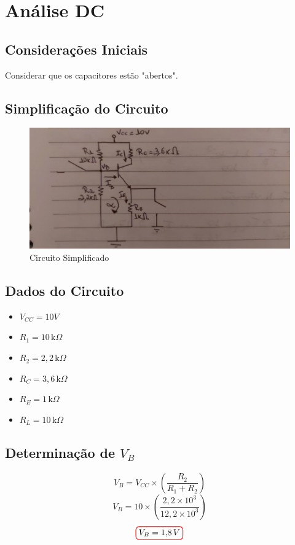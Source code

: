 \documentclass[12pt,openany,oneside,a4paper]{abntex2}
\begin{document}
\imprimircapa
\imprimirfolhaderosto*

\tableofcontents

\chapter{Análise DC}
\section{Considerações Iniciais}
Considerar que os capacitores estão "abertos".

\section{Simplificação do Circuito}
\begin{figure}[h]
  \centering
  \includegraphics[width=\linewidth]{f1.jpeg}
  \caption{Circuito Simplificado}
  \label{fig:exemplo}
\end{figure}

\section{Dados do Circuito}
\begin{itemize}
    \item $V_{CC} = 10V$
    \item $R_1 = 10\,\text{k}\Omega$
    \item $R_2 = 2{,}2\,\text{k}\Omega$
    \item $R_C = 3{,}6 \, \text{k}\Omega$
    \item $R_E = 1 \, \text{k}\Omega$
    \item $R_L = 10 \, \text{k}\Omega$
\end{itemize}

\section{Determinação de $V_B$}
\[
V_B = V_{CC} \times \left(\frac{R_2}{R_1 + R_2}\right)
\]
\[
V_B = 10 \times (\frac{2{,}2 \times 10^3}{12{,}2 \times 10^3})
\]
\[
\tikz[baseline]{\node[draw=red, thick, rounded corners] {$V_B = 1{,}8\,V$};}
\]
\end{document}
